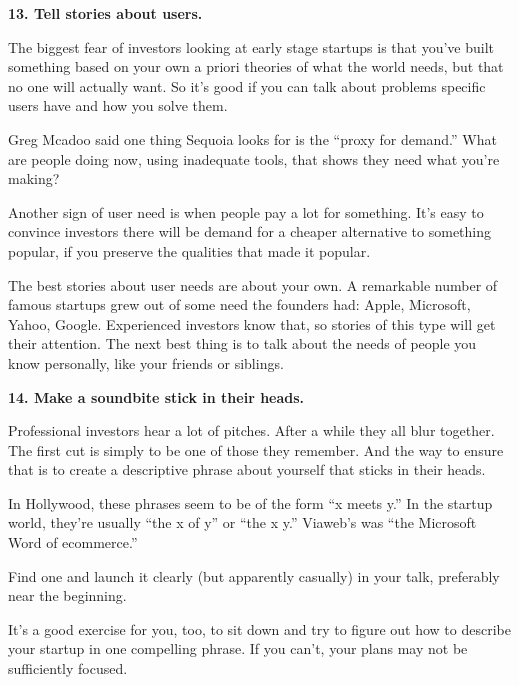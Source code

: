 \textbf{13. Tell stories about users.}

The biggest fear of investors looking at early stage startups is that
you've built something based on your own a priori theories of what the
world needs, but that no one will actually want. So it's good if you can
talk about problems specific users have and how you solve them.

Greg Mcadoo said one thing Sequoia looks for is the ``proxy for
demand.'' What are people doing now, using inadequate tools, that shows
they need what you're making?

Another sign of user need is when people pay a lot for something. It's
easy to convince investors there will be demand for a cheaper
alternative to something popular, if you preserve the qualities that
made it popular.

The best stories about user needs are about your own. A remarkable
number of famous startups grew out of some need the founders had: Apple,
Microsoft, Yahoo, Google. Experienced investors know that, so stories of
this type will get their attention. The next best thing is to talk about
the needs of people you know personally, like your friends or siblings.

\textbf{14. Make a soundbite stick in their heads.}

Professional investors hear a lot of pitches. After a while they all
blur together. The first cut is simply to be one of those they remember.
And the way to ensure that is to create a descriptive phrase about
yourself that sticks in their heads.

In Hollywood, these phrases seem to be of the form ``x meets y.'' In the
startup world, they're usually ``the x of y'' or ``the x y.'' Viaweb's
was ``the Microsoft Word of ecommerce.''

Find one and launch it clearly (but apparently casually) in your talk,
preferably near the beginning.

It's a good exercise for you, too, to sit down and try to figure out how
to describe your startup in one compelling phrase. If you can't, your
plans may not be sufficiently focused.
